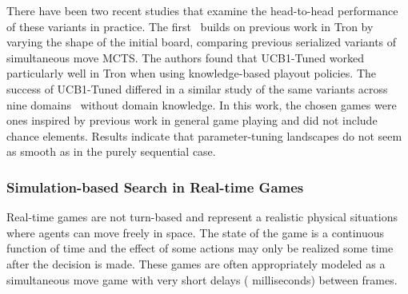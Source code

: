 There have been two recent studies that examine the head-to-head performance of these variants in practice. 
The first~\cite{Lanctot13Tron} builds on previous work in Tron by varying the shape of the initial board, 
comparing previous serialized variants of simultaneous move MCTS. The authors found that UCB1-Tuned worked 
particularly well in Tron when using knowledge-based playout policies. The success of UCB1-Tuned differed in 
a similar study of the same variants across nine domains~\cite{Tak14smmcts} without domain knowledge. In this 
work, the chosen games were ones inspired by previous work in general game playing and did not include chance elements. 
Results indicate that parameter-tuning landscapes do not seem as smooth as in the purely sequential case. 


\subsubsection{Simulation-based Search in Real-time Games}


Real-time games are not turn-based and represent a realistic physical situations where agents can move freely in space. 
The state of the game is a continuous function of time and the effect of some actions may only be realized some time 
after the decision is made. These games are often appropriately modeled as a simultaneous move game with very short 
delays ( milliseconds) between frames. 

